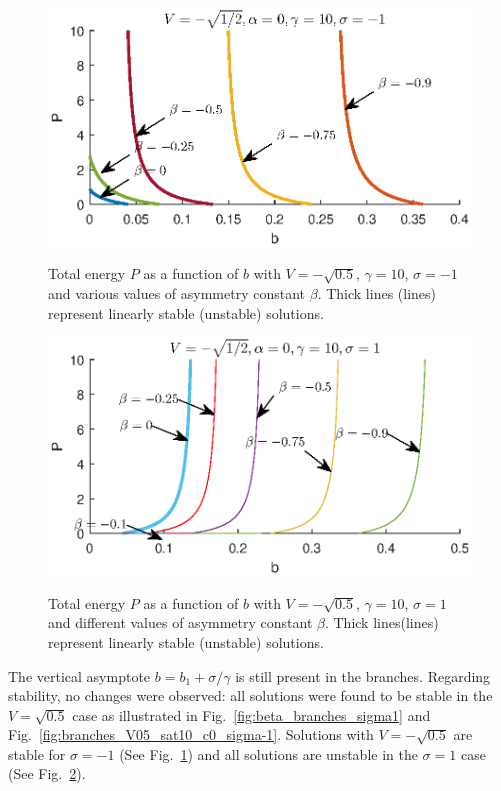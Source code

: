 \documentclass[aps,pre,showpacs,twocolumn]{revtex4}
\begin{document}
\begin{figure}[!htb]
\begin{center}
\scalebox{.7} {\includegraphics{branches_V-05_sat10_c0_sigma-1.eps}}
\end{center}
\caption{Total energy $P$ as a function of $b$ with $V=-\sqrt{0.5}$, $\gamma=10$, $\sigma=-1$ and various values of asymmetry constant $\beta$. Thick lines (lines) represent linearly stable (unstable) solutions.}
\label{fig:branches_V-05_sat10_c0_sigma-1}
\end{figure}
\begin{figure}[!htb]
\begin{center}
\scalebox{.7} {\includegraphics{branches_V-05_sat10_c0_sigma1.eps}}
\end{center}
\caption{Total energy $P$ as a function of $b$ with $V=-\sqrt{0.5}$, $\gamma=10$, $\sigma=1$ and different values of asymmetry  constant $\beta$. Thick lines(lines) represent linearly stable (unstable) solutions.}
\label{fig:branches_V-05_sat10_c0_sigma1}
\end{figure}
The vertical asymptote $b=b_1+\sigma/\gamma$ is still present in the branches. Regarding stability, no changes were observed: all solutions were found to be stable in the $V=\sqrt{0.5}$ case as illustrated in Fig.~\ref{fig:beta_branches_sigma1} and Fig.~\ref{fig:branches_V05_sat10_c0_sigma-1}. Solutions with $V=-\sqrt{0.5}$ are stable for $\sigma=-1$ (See Fig.~\ref{fig:branches_V-05_sat10_c0_sigma-1}) and  all solutions are unstable in the $\sigma=1$ case (See Fig.~\ref{fig:branches_V-05_sat10_c0_sigma1}). 
\end{document}
